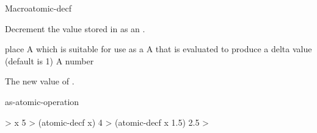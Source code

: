 \documentclass[10pt,twoside,english,pdftex]{article}
\begin{document}
\begin{functiondoc}{Macro}{atomic-decf}{
    }
%

\fnsyntax \fnpurpose Decrement the value stored in  as an
.

\fnpackage {}

\fnmodule {}

\fnargs
\begin{args}{place}
\arg[place] A  which is suitable for use as a
 A  that is evaluated to produce a delta value
(default is 1)
 A number
\end{args}

\fnreturns The new value of . 

\begin{alsos}{as-atomic-operation}
\end{alsos}

\fnexamples
%
\W\supp
\begin{example}
  > x
  5
  > (atomic-decf x)
  4
  > (atomic-decf x 1.5)
  2.5
  >
\end{example}

\end{functiondoc}

\end{document}
